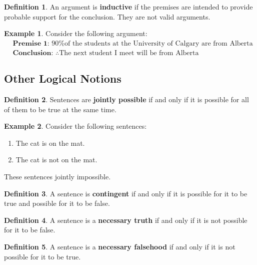 \documentclass{tufte-handout}
\theoremstyle{definition}
\newtheorem{defn}{Definition}
\theoremstyle{example}
\newtheorem{exmp}{Example}
\theoremstyle{remark}
\newtheorem{rem}{Remark}
\begin{document}
\begin{defn}
  An argument is \textbf{inductive} if the premises are intended to provide probable support for the conclusion. They are not valid arguments.
\end{defn}
\begin{exmp}
  Consider the following argument:
  \begin{align*}
     & \textbf{Premise 1: } \text{90\% of the students at the University of Calgary are from Alberta} \\
     & \textbf{Conclusion: } \therefore \text{The next student I meet will be from Alberta}
  \end{align*}
\end{exmp}

\subsection{Other Logical Notions}
\begin{defn}
  Sentences are \textbf{jointly possible} if and only if it is possible for all of them to be true at the same time.
\end{defn}
\begin{exmp}
  Consider the following sentences:
  \begin{enumerate}[leftmargin=3\parindent]
    \item The cat is on the mat.
    \item The cat is not on the mat.
  \end{enumerate}
  These sentences jointly impossible.
\end{exmp}
\begin{defn}
  A sentence is \textbf{contingent} if and only if it is possible for it to be true and possible for it to be false.
\end{defn}
\begin{defn}
  A sentence is a \textbf{necessary truth} if and only if it is not possible for it to be false.
\end{defn}
\begin{defn}
  A sentence is a \textbf{necessary falsehood} if and only if it is not possible for it to be true.
\end{defn}
\end{document}
